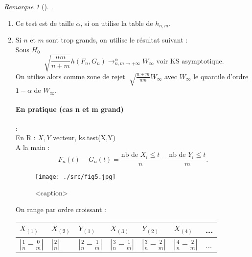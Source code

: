 \documentclass{article}
\theoremstyle{plain}%
\theoremstyle{definition}
\theoremstyle{remark}
\newtheorem*{rem}{Remarque}
\begin{document}
\begin{rem}[].
    \begin{enumerate}
        \item Ce test est de taille $ \alpha  $, si on utilise la table de $ h_{n,m} $.
        \item Si $ n $ et $ m $ sont trop grands, on utilise le résultat suivant : \\
            Sous $ H_0 $ 
            \[
                \sqrt[]{\frac{nm}{n+m}}h(F_n, G_n) \to ^{\alpha }_{n,m \to +\infty } W_\infty \text{ voir KS asymptotique}
            .\]
            On utilise alors comme zone de rejet $ \sqrt[]{\frac{n+m}{nm}}W_\infty  $ avec $ W_\infty  $ le quantile d'ordre $ 1 - \alpha  $ de $ W_\infty  $.

            \paragraph{En pratique (cas n et m grand)} : \\ 
            En R : $ X,Y $ vecteur, ks.test(X,Y) \\
            A la main : 
            \[
                F_n(t) - G_n(t) = \frac{\text{nb de } X_i \leq t}{n} - \frac{\text{nb de } Y_i \leq t}{m}
            .\]

            \begin{figure}[!htb]
                \centering
                \texttt{[image: ./src/fig5.jpg]}
                \caption{<caption>}
                \label{<label>}
            \end{figure}
            
            On range par ordre croissant : 

            \begin{table}[!h]
                \centering
                \begin{tabular}{|l|l|l|l|l|l|l|}
                \hline
                    $ X_{(1)} $ & $ X_{(2)} $ & $ Y_{(1)} $ & $ X_{(3)} $ & $ Y_{(2)} $ & $ X_{(4)} $ & ... \\ \hline
                    $ \left| \frac{1}{n} - \frac{0}{m} \right|  $  & $ \left| \frac{2}{n} \right| $  & $ \left| \frac{2}{n} - \frac{1}{m} \right|  $  & $ \left| \frac{3}{n} - \frac{1}{m} \right|  $ & $ \left| \frac{3}{n} - \frac{2}{m} \right|  $ & $ \left| \frac{4}{n} - \frac{2}{m}\right|  $ & ... \\ \hline
                \end{tabular}
            \end{table}


\end{enumerate}
\end{rem}
\end{document}
